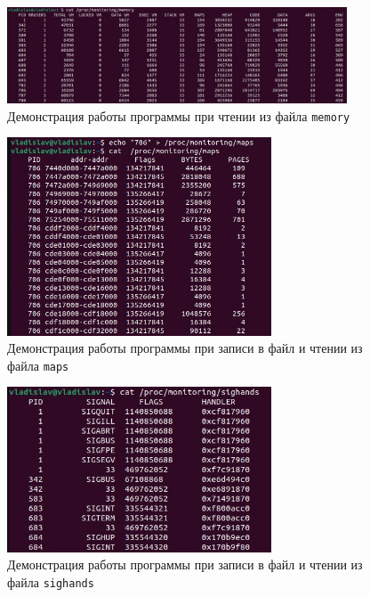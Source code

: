 \begin{figure}[h]
	\centering
	\includegraphics[width=0.9\textwidth]{img/example-memory}
	\caption{Демонстрация работы программы при чтении из файла \texttt{memory}}
	\label{img:exmaple-memory}
\end{figure}

\begin{figure}[h]
	\centering
	\includegraphics[width=0.7\textwidth]{img/example-maps}
	\caption{Демонстрация работы программы при записи в файл и чтении из файла \texttt{maps}}
	\label{img:exmaple-maps}
\end{figure}

\begin{figure}[h]
	\centering
	\includegraphics[width=0.7\textwidth]{img/example-sighand}
	\caption{Демонстрация работы программы при записи в файл и чтении из файла \texttt{sighands}}
	\label{img:exmaple-sighand}
\end{figure}
